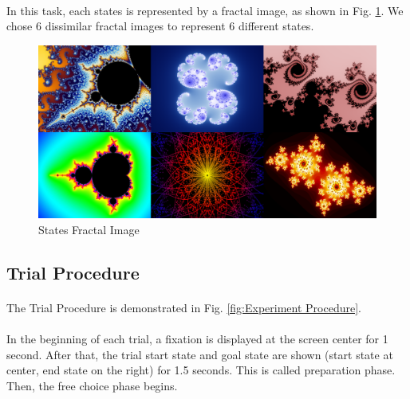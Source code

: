 \paragraph{}
In this task, each states is represented by a fractal image, as shown in Fig. \ref{fig:fractal}. We chose 6 dissimilar fractal images to represent 6 different states. 

\begin{figure}[ht]
\centering
\includegraphics[width=\columnwidth]{Figures/fractal}
\decoRule
\caption{States Fractal Image}
\label{fig:fractal}
\end{figure}

\subsection{Trial Procedure}
\label{sec:Trial Procedure}
\paragraph{}
The Trial Procedure is demonstrated in Fig. \ref{fig:Experiment Procedure}. 
\paragraph{}
In the beginning of each trial, a fixation is displayed at the screen center for 1 second. After that, the trial start state and goal state are shown (start state at center, end state on the right) for 1.5 seconds. This is called preparation phase. Then, the free choice phase begins. 
